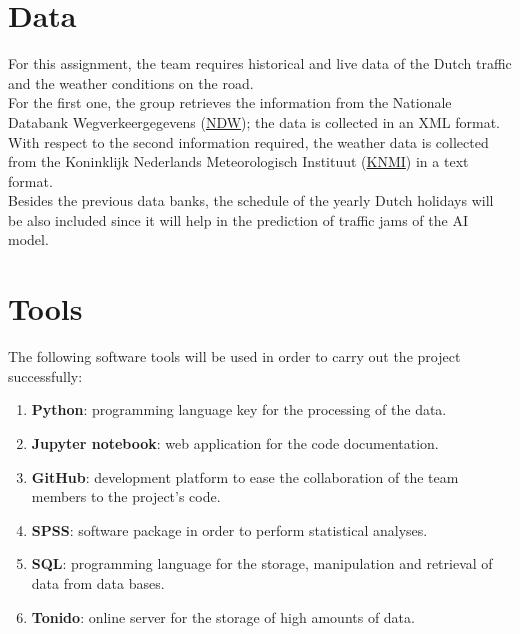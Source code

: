 \section{Data}

For this assignment, the team requires historical and live data of the Dutch traffic and the weather conditions on the road.\\

For the first one, the group retrieves the information from the Nationale Databank Wegverkeergegevens (\underline{NDW}); the data is collected in an XML format.\\

With respect to the second information required, the weather data is collected from the Koninklijk Nederlands Meteorologisch Instituut (\underline{KNMI}) in a text format.\\

Besides the previous data banks, the schedule of the yearly Dutch holidays will be also included since it will help in the prediction of traffic jams of the AI model.\\

\section{Tools}

The following software tools will be used in order to carry out the project successfully:

\begin{enumerate}
	\item \textbf{Python}: programming language key for the processing of the data.
	\item \textbf{Jupyter notebook}: web application for the code documentation.
	\item \textbf{GitHub}: development platform to ease the collaboration of the team members to the project's code.
	\item \textbf{SPSS}: software package in order to perform statistical analyses.
	\item  \textbf{SQL}: programming language for the storage, manipulation and retrieval of data from data bases.
	\item \textbf{Tonido}: online server for the storage of high amounts of data.
\end{enumerate}
